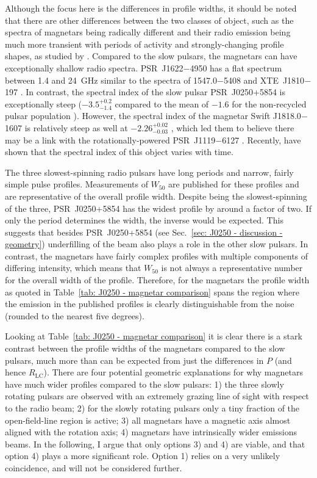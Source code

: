 Although the focus here is the differences in profile widths, it should be noted that there are other differences between the two classes of object, such as the spectra of magnetars being radically different and their radio emission being much more transient with periods of activity and strongly-changing profile shapes, as studied by \citet{SSW+2009, DJW+2018, LLD+2019, DLB+2019,LJS+2021}.
Compared to the slow pulsars, the magnetars can have exceptionally shallow radio spectra. PSR~J1622$-$4950 has a flat spectrum between 1.4 and 24~GHz \citep{KJLB2011} similar to the spectra of 1547.0$-$5408 and XTE~J1810$-$197 \citep{CRJ+2007b, CRHR2007a, KSJ+2007}. In contrast, the spectral index of the slow pulsar PSR~J0250+5854 is exceptionally steep ($-3.5^{+0.2}_{-1.4}$ compared to the mean of $-1.6$ for the non-recycled pulsar population \citealt{JSK+2018}). However, the spectral index of the magnetar Swift J1818.0$-$1607 is relatively steep as well at $-2.26^{+0.02}_{-0.03}$ \citep{LSJB2020}, which led them to believe there may be a link with the rotationally-powered PSR~J1119$-$6127 \citep[e.g][]{MPD+2017,DJW+2018}. Recently, \citet{CCC+2020} have shown that the spectral index of this object varies with time. 

The three slowest-spinning radio pulsars have long periods and narrow, fairly simple pulse profiles. Measurements of $W_{50}$ are published for these profiles and are representative of the overall profile width. Despite being the slowest-spinning of the three, PSR~J0250+5854 has the widest profile by around a factor of two. If only the period determines the width, the inverse would be expected. This suggests that besides PSR~J0250+5854 (see Sec.~\ref{sec: J0250 - discussion - geometry}) underfilling of the beam also plays a role in the other slow pulsars. In contrast, the magnetars have fairly complex profiles with multiple components of differing intensity, which means that $W_{50}$ is not always a representative number for the overall width of the profile. Therefore, for the magnetars the profile width as quoted in Table~\ref{tab: J0250 - magnetar comparison} spans the region where the emission in the published profiles is clearly distinguishable from the noise (rounded to the nearest five degrees).

Looking at Table~\ref{tab: J0250 - magnetar comparison} it is clear there is a stark contrast between the profile widths of the magnetars compared to the slow pulsars, much more than can be expected from just the differences in $P$ (and hence $R_\mathrm{LC}$). There are four potential geometric explanations for why magnetars have much wider profiles compared to the slow pulsars: 1) the three slowly rotating pulsars are observed with an extremely grazing line of sight with respect to the radio beam; 2) for the slowly rotating pulsars only a tiny fraction of the open-field-line region is active; 3) all magnetars have a magnetic axis almost aligned with the rotation axis; 4) magnetars have intrinsically wider emissions beams. In the following, I argue that only options 3) and 4) are viable, and that option 4) plays a more significant role. Option 1) relies on a very unlikely coincidence, and will not be considered further. 

